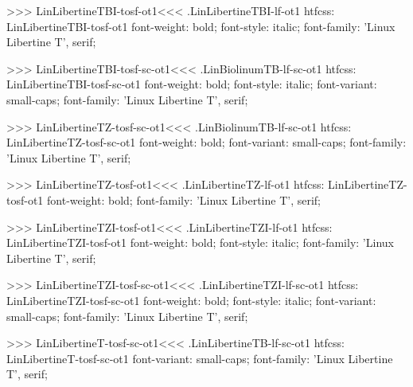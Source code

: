 {{{{{{{>>>
\<LinLibertineTBI-tosf-ot1\><<<
.LinLibertineTBI-lf-ot1
htfcss:  LinLibertineTBI-tosf-ot1  font-weight: bold; font-style: italic; font-family: 'Linux Libertine T', serif;

>>>
\<LinLibertineTBI-tosf-sc-ot1\><<<
.LinBiolinumTB-lf-sc-ot1
htfcss:  LinLibertineTBI-tosf-sc-ot1  font-weight: bold; font-style: italic; font-variant: small-caps; font-family: 'Linux Libertine T', serif;

>>>
\<LinLibertineTZ-tosf-sc-ot1\><<<
.LinBiolinumTB-lf-sc-ot1
htfcss:  LinLibertineTZ-tosf-sc-ot1  font-weight: bold; font-variant: small-caps; font-family: 'Linux Libertine T', serif;

>>>
\<LinLibertineTZ-tosf-ot1\><<<
.LinLibertineTZ-lf-ot1
htfcss:  LinLibertineTZ-tosf-ot1  font-weight: bold; font-family: 'Linux Libertine T', serif;

>>>
\<LinLibertineTZI-tosf-ot1\><<<
.LinLibertineTZI-lf-ot1
htfcss:  LinLibertineTZI-tosf-ot1  font-weight: bold; font-style: italic; font-family: 'Linux Libertine T', serif;

>>>
\<LinLibertineTZI-tosf-sc-ot1\><<<
.LinLibertineTZI-lf-sc-ot1
htfcss:  LinLibertineTZI-tosf-sc-ot1  font-weight: bold; font-style: italic; font-variant: small-caps; font-family: 'Linux Libertine T', serif;

>>>
\<LinLibertineT-tosf-sc-ot1\><<<
.LinLibertineTB-lf-sc-ot1
htfcss:  LinLibertineT-tosf-sc-ot1  font-variant: small-caps; font-family: 'Linux Libertine T', serif;

}}}}}}}
